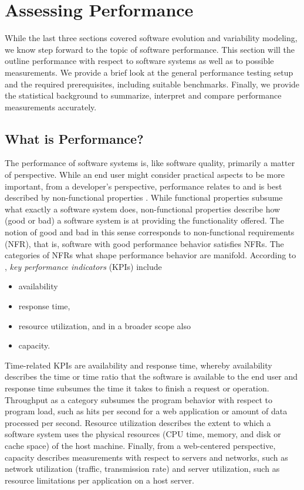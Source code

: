 \section{Assessing Performance} \label{sec:2.2}
While the last three sections covered software evolution and variability
modeling, we know step forward to the topic of software performance. This
section will the outline performance with respect to software systems as well
as to possible measurements. We provide a brief look at the general performance
testing setup and the required prerequisites, including suitable benchmarks.
Finally, we provide the statistical background to summarize, interpret and
compare performance measurements accurately.

\subsection{What is Performance?}
The performance of software systems is, like software quality, primarily a
matter of perspective. While an end user might consider practical aspects to be
more important, from a developer’s perspective, performance relates to and is
best described by non-functional properties \citep{molyneaux_art_2014}. While
functional properties subsume what exactly a software system does, non-functional
properties describe how (good or bad) a software system is at providing the
functionality offered. The notion of good and bad in this sense corresponds to
non-functional requirements (NFR), that is, software with good performance
behavior satisfies NFRs. The categories of NFRs what shape performance behavior
are manifold. According to \cite{molyneaux_art_2014}, \emph{key performance
indicators} (KPIs) include 

\begin{itemize}
  \item availability
  \item response time,
  \item resource utilization, and in a broader scope also 
  \item capacity.
\end{itemize}

Time-related KPIs are availability and response time, whereby
availability describes the time or time ratio that the software is available to
the end user and response time subsumes the time it takes to finish a request
or operation. Throughput as a category subsumes the program behavior with
respect to program load, such as hits per second for a web application or
amount of data processed per second. Resource utilization describes the extent
to which a software system uses the physical resources (CPU time, memory, and
disk or cache space) of the host machine. Finally, from a web-centered
perspective, capacity describes measurements with respect to servers and
networks, such as network utilization  (traffic, transmission rate) and server
utilization, such as resource limitations per application on a host server.

